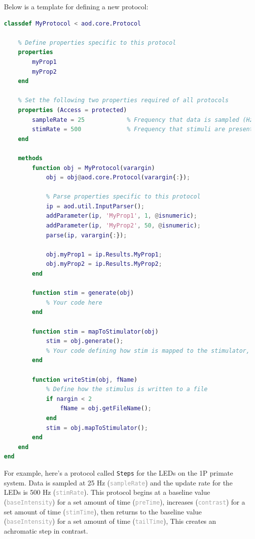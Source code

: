 \documentclass[10pt]{exam}
\newcommand\aodclass[1]{\textcolor{codeblue}{\texttt{#1}}}
\newcommand\aodprop[1]{\textcolor{darkgray}{\texttt{#1}}}
\begin{document}
		\noindent Below is a template for defining a new protocol:
		\begin{lstlisting}[language=matlab]
classdef MyProtocol < aod.core.Protocol

	% Define properties specific to this protocol
	properties
		myProp1
		myProp2
	end 
	
	% Set the following two properties required of all protocols
	properties (Access = protected)
		sampleRate = 25            % Frequency that data is sampled (Hz)  	
		stimRate = 500             % Frequency that stimuli are presented (Hz)         
	end
	
	methods
		function obj = MyProtocol(varargin)
			obj = obj@aod.core.Protocol(varargin{:});
			
			% Parse properties specific to this protocol
			ip = aod.util.InputParser();
			addParameter(ip, 'MyProp1', 1, @isnumeric);
			addParameter(ip, 'MyProp2', 50, @isnumeric);
			parse(ip, varargin{:});
		
			obj.myProp1 = ip.Results.MyProp1;
			obj.myProp2 = ip.Results.MyProp2;
		end
	
		function stim = generate(obj)
			% Your code here
		end
	
		function stim = mapToStimulator(obj)
			stim = obj.generate();
			% Your code defining how stim is mapped to the stimulator, if necessary
		end
	
		function writeStim(obj, fName)
			% Define how the stimulus is written to a file
			if nargin < 2
				fName = obj.getFileName();
			end
			stim = obj.mapToStimulator();
		end
	end
end
		\end{lstlisting}
		For example, here's a protocol called \aodclass{Steps} for the LEDs on the 1P primate system. Data is sampled at 25 Hz (\aodprop{sampleRate}) and the update rate for the LEDs is 500 Hz (\aodprop{stimRate}). 
		This protocol begins at a baseline value (\aodprop{baseIntensity}) for a set amount of time (\aodprop{preTime}), increases (\aodprop{contrast}) for a set amount of time (\aodprop{stimTime}), then returns to the baseline value (\aodprop{baseIntensity}) for a set amount of time (\aodprop{tailTime}), This creates an achromatic step in contrast.
\end{document}
